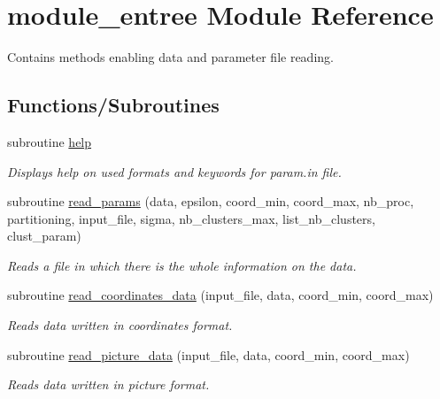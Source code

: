 \hypertarget{namespacemodule__entree}{}\section{module\+\_\+entree Module Reference}
\label{namespacemodule__entree}


Contains methods enabling data and parameter file reading.  


\subsection*{Functions/\+Subroutines}
\begin{DoxyCompactItemize}
\item 
subroutine \hyperlink{namespacemodule__entree_ae91fc1d896afb27c01d7314dce81db70}{help}
\begin{DoxyCompactList}\small\item\em Displays help on used formats and keywords for {\itshape param.\+in} file. \end{DoxyCompactList}\item 
subroutine \hyperlink{namespacemodule__entree_a4a8eec4484896ca8cb249548e1cf537f}{read\+\_\+params} (data, epsilon, coord\+\_\+min, coord\+\_\+max, nb\+\_\+proc, partitioning, input\+\_\+file, sigma, nb\+\_\+clusters\+\_\+max, list\+\_\+nb\+\_\+clusters, clust\+\_\+param)
\begin{DoxyCompactList}\small\item\em Reads a file in which there is the whole information on the data. \end{DoxyCompactList}\item 
subroutine \hyperlink{namespacemodule__entree_a93d220ea64cd5e1d155255bca188de0c}{read\+\_\+coordinates\+\_\+data} (input\+\_\+file, data, coord\+\_\+min, coord\+\_\+max)
\begin{DoxyCompactList}\small\item\em Reads data written in coordinates format. \end{DoxyCompactList}\item 
subroutine \hyperlink{namespacemodule__entree_aaa0e9ef36218a32292aa65a9b8602cda}{read\+\_\+picture\+\_\+data} (input\+\_\+file, data, coord\+\_\+min, coord\+\_\+max)
\begin{DoxyCompactList}\small\item\em Reads data written in picture format. \end{DoxyCompactList}\item 

\end{DoxyCompactItemize}
